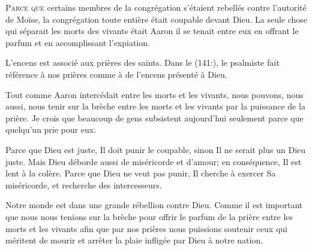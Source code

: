 \dvrule







\lettrine{P}{arce que} certains membres de la congrégation s'étaient
 rebellés contre l'autorité de Moïse,
 la congrégation toute entière était coupable devant Dieu.
 La seule chose qui séparait les morts des vivants était Aaron
 \ocadr{}il se tenait entre eux en offrant le parfum
 et en accomplissant l'expiation.

L'encens est associé aux prières des saints.
 Dans le (141:), le psalmiste
 fait référence à nos prières comme à de l'encens présenté à Dieu.


Tout comme Aaron intercédait entre les morts et les vivants, nous pouvons,
 nous aussi, nous tenir sur la brèche entre les morts et les vivants
 par la puissance de la prière.
 Je crois que beaucoup de gens subsistent aujourd'hui
 seulement parce que quelqu'un prie pour eux.

Parce que Dieu est juste, Il doit punir le coupable,
 sinon Il ne serait plus un Dieu juste.
 Mais Dieu déborde aussi de miséricorde et d'amour;
 en conséquence, Il est lent à la colère.
 Parce que Dieu ne veut pas punir, Il cherche à exercer Sa miséricorde,
 et recherche des intercesseurs.

Notre monde est dans une grande rébellion contre Dieu.
 Comme il est important que nous nous tenions sur la brèche
 pour offrir le parfum de la prière entre les morts et les vivants
 \ocadr{}afin que par nos prières nous puissions soutenir
 ceux qui méritent de mourir et arrêter la plaie infligée
 par Dieu à notre nation. 

